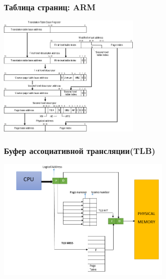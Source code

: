 \begin{frame}
  \frametitle{Таблица страниц: ARM}
  \begin{center}
    \includegraphics[height=6cm]{slides/processor_arch/large_page_table_walk_armv6_format.png}
  \end{center}
\end{frame}

\begin{frame}
  \frametitle{Буфер ассоциативной трансляции(TLB)}
  \begin{center}
    \includegraphics[height=6cm]{slides/processor_arch/Translation_Lookaside_Buffer.png}
  \end{center}
\end{frame}

